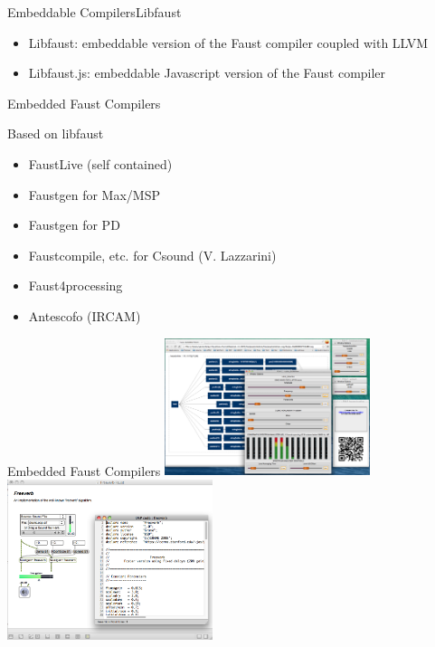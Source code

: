 
\begin{frame}[fragile]{Embeddable Compilers}{Libfaust}
    \begin{itemize}
        \item Libfaust: embeddable version of the Faust compiler coupled with LLVM
        \item Libfaust.js: embeddable Javascript version of the Faust compiler
    \end{itemize}
\end{frame}


\begin{frame}{Embedded Faust Compilers}
    \begin{block}{Based on libfaust}
        \begin{itemize}
            \item FaustLive (self contained)
            \item Faustgen for Max/MSP
            \item Faustgen for PD
            \item Faustcompile, etc. for Csound (V. Lazzarini)
            \item Faust4processing
            \item Antescofo (IRCAM)
        \end{itemize}    
    \end{block} 
\end{frame}


\begin{frame}{Embedded Faust Compilers}
    \includegraphics[width=0.45\textwidth]{images/FaustLiveSession}
    \hspace{0.2cm}
    \includegraphics[width=0.45\textwidth]{images/faustgen1.png}
\end{frame}
